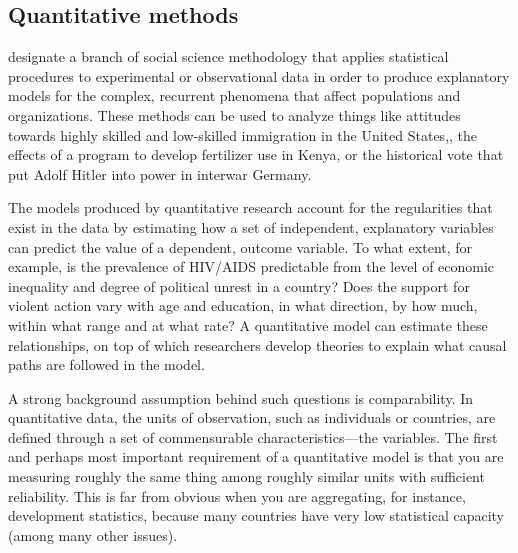 	
	
	\subsection{Quantitative methods}%
		\label{sec:quantitative-methods}

	 designate a branch of social science methodology that applies statistical procedures to experimental or observational data in order to produce explanatory models for the complex, recurrent phenomena that affect populations and organizations. These methods can be used to analyze things like attitudes towards highly skilled and low-skilled immigration in the United States,\cite{HainmuellerHiscox:2010a}, the effects of a program to develop fertilizer use in Kenya,\cite{DufloKremer:2009a} or the historical vote that put Adolf Hitler into power in interwar Germany\cite{KingRosen:2008a}.%

	The models produced by quantitative research account for the regularities that exist in the data by estimating how a set of independent, explanatory variables can predict the value of a dependent, outcome variable. To what extent, for example, is the prevalence of HIV/AIDS predictable from the level of economic inequality and degree of political unrest in a country? Does the support for violent action vary with age and education, in what direction, by how much, within what range and at what rate? A quantitative model can estimate these relationships, on top of which researchers develop theories to explain what causal paths are followed in the model.%

	A strong background assumption behind such questions is comparability. In quantitative data, the units of observation, such as individuals or countries, are defined through a set of commensurable characteristics—the variables. The first and perhaps most important requirement of a quantitative model is that you are measuring roughly the same thing among roughly similar units with sufficient reliability. This is far from obvious when you are aggregating, for instance, development statistics, because many countries have very low statistical capacity (among many other issues).\cite{Jerven:2013a}%

